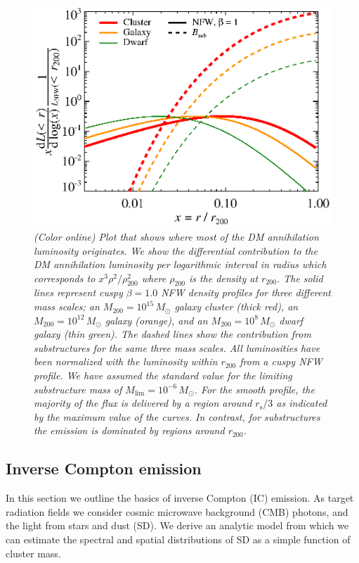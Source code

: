 \documentclass[10pt,aps,pra,reprint,amsmath,amsfonts,amssymb,showpacs,nofootinbib,floatfix]{revtex4-1}
\newcommand{\rmn}{\mathrm}
\newcommand{\msun}{M_\odot}
\newcommand{\s}{\rmn{s}}
\newcommand{\rvir}{r_{200}}
\newcommand{\mvir}{M_{200}}
\begin{document}
\begin{figure}
  \includegraphics[width=0.99\columnwidth]{figures/emissiv.sub.bw.eps}
  \caption{\it (Color online) Plot that shows where most of the DM
    annihilation luminosity originates. We show the differential
    contribution to the DM annihilation luminosity per logarithmic
    interval in radius which corresponds to $x^3\rho^2/\rho^2_{200}$
    where $\rho_{200}$ is the density at $\rvir$. The solid lines
    represent cuspy $\beta=1.0$ NFW density profiles for three
    different mass scales; an $\mvir=10^{15}\,\msun$ galaxy cluster
    (thick red), an $\mvir=10^{12}\,\msun$ galaxy (orange), and an
    $\mvir=10^{8}\,\msun$ dwarf galaxy (thin green). The dashed lines
    show the contribution from substructures for the same three mass
    scales. All luminosities have been normalized with the luminosity
    within $\rvir$ from a cuspy NFW profile. We have assumed the
    standard value for the limiting substructure mass of
    $M_\rmn{lim}=10^{-6}\,\msun$. For the smooth profile, the majority
    of the flux is delivered by a region around $r_\s/3$ as indicated
    by the maximum value of the curves. In contrast, for substructures
    the emission is dominated by regions around $r_{200}$.}
  \label{fig:radial_emis}
\end{figure}


\subsection{Inverse Compton emission}
\label{sect:IC}

In this section we outline the basics of inverse Compton (IC)
emission. As target radiation fields we consider cosmic microwave
background (CMB) photons, and the light from stars and dust (SD). We
derive an analytic model from which we can estimate the spectral
and spatial distributions of SD as a simple function of cluster mass.
\end{document}
